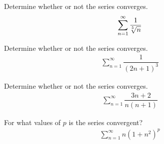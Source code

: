 \begin{exercise}
Determine whether or not the series converges.
\begin{align*}
    \sum_{n=1}^{\infty} \dfrac{1}{\sqrt[\leftroot{2}\uproot{2}5]{n}}
\end{align*}
\end{exercise}

\begin{exercise}
Determine whether or not the series converges.
\begin{align*}
    \sum_{n=1}^{\infty} \dfrac{1}{(2n+1)^{3}}
\end{align*}
\end{exercise}

\begin{exercise}
Determine whether or not the series converges.
\begin{align*}
    \sum_{n=1}^{\infty} \dfrac{3n+2}{n(n+1)}
\end{align*}
\end{exercise}

\begin{exercise}
For what values of $p$ is the series convergent?
\begin{align*}
    \sum_{n=1}^{\infty} n(1+n^{2})^{p}
\end{align*}
\end{exercise}